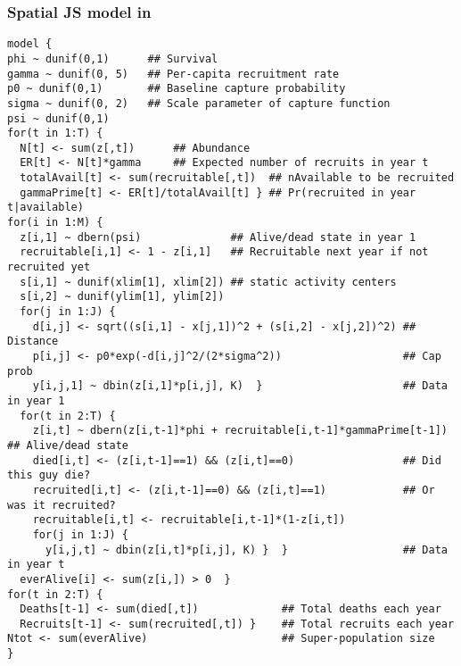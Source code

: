 \documentclass[color=usenames,dvipsnames]{beamer}\usepackage[]{graphicx}\usepackage[]{xcolor}
\makeatletter
\newenvironment{kframe}{%
 \def\at@end@of@kframe{}%
 \ifinner\ifhmode%
  \def\at@end@of@kframe{\end{minipage}}%
  \begin{minipage}{\columnwidth}%
 \fi\fi%
 \def\FrameCommand##1{\hskip\@totalleftmargin \hskip-\fboxsep
 \colorbox{shadecolor}{##1}\hskip-\fboxsep
     \hskip-\linewidth \hskip-\@totalleftmargin \hskip\columnwidth}%
 \MakeFramed {\advance\hsize-\width
   \@totalleftmargin\z@ \linewidth\hsize
   \@setminipage}}%
 {\par\unskip\endMakeFramed%
 \at@end@of@kframe}
\newenvironment{knitrout}{}{} %
\makeatother
\begin{document}
\begin{frame}[fragile]
  \frametitle{Spatial JS model in \jags}
  \tiny
\begin{knitrout}\tiny
{}\color{fgcolor}\begin{kframe}
\begin{verbatim}
model {
phi ~ dunif(0,1)      ## Survival
gamma ~ dunif(0, 5)   ## Per-capita recruitment rate
p0 ~ dunif(0,1)       ## Baseline capture probability
sigma ~ dunif(0, 2)   ## Scale parameter of capture function
psi ~ dunif(0,1)    
for(t in 1:T) {
  N[t] <- sum(z[,t])      ## Abundance
  ER[t] <- N[t]*gamma     ## Expected number of recruits in year t
  totalAvail[t] <- sum(recruitable[,t])  ## nAvailable to be recruited
  gammaPrime[t] <- ER[t]/totalAvail[t] } ## Pr(recruited in year t|available)
for(i in 1:M) {
  z[i,1] ~ dbern(psi)              ## Alive/dead state in year 1
  recruitable[i,1] <- 1 - z[i,1]   ## Recruitable next year if not recruited yet
  s[i,1] ~ dunif(xlim[1], xlim[2]) ## static activity centers
  s[i,2] ~ dunif(ylim[1], ylim[2])
  for(j in 1:J) {
    d[i,j] <- sqrt((s[i,1] - x[j,1])^2 + (s[i,2] - x[j,2])^2) ## Distance
    p[i,j] <- p0*exp(-d[i,j]^2/(2*sigma^2))                   ## Cap prob
    y[i,j,1] ~ dbin(z[i,1]*p[i,j], K)  }                      ## Data in year 1
  for(t in 2:T) {
    z[i,t] ~ dbern(z[i,t-1]*phi + recruitable[i,t-1]*gammaPrime[t-1]) ## Alive/dead state 
    died[i,t] <- (z[i,t-1]==1) && (z[i,t]==0)                 ## Did this guy die?
    recruited[i,t] <- (z[i,t-1]==0) && (z[i,t]==1)            ## Or was it recruited?
    recruitable[i,t] <- recruitable[i,t-1]*(1-z[i,t])
    for(j in 1:J) {
      y[i,j,t] ~ dbin(z[i,t]*p[i,j], K) }  }                  ## Data in year t
  everAlive[i] <- sum(z[i,]) > 0  }
for(t in 2:T) {
  Deaths[t-1] <- sum(died[,t])             ## Total deaths each year
  Recruits[t-1] <- sum(recruited[,t]) }    ## Total recruits each year
Ntot <- sum(everAlive)                     ## Super-population size
}
\end{verbatim}
\end{kframe}
\end{knitrout}
\end{frame}
\end{document}
